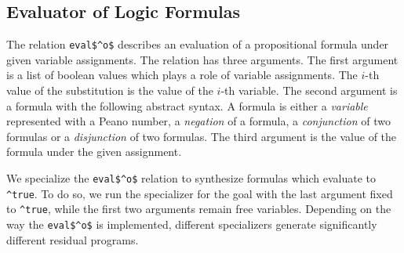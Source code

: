 



\subsection{Evaluator of Logic Formulas}

The relation \lstinline{eval$^o$} describes an evaluation of a propositional formula under given variable assignments.
The relation has three arguments. The first argument is a list of boolean values which plays a role of variable assignments.
The $i$-th value of the substitution is the value of the $i$-th variable.
The second argument is a formula with the following abstract syntax.
A formula is either a \emph{variable} represented with a Peano number, a \emph{negation} of a formula, a \emph{conjunction} of two formulas or a \emph{disjunction} of two formulas.
The third argument is the value of the formula under the given assignment.

We specialize the \lstinline{eval$^o$} relation to synthesize formulas which evaluate to \lstinline{^true}.
To do so, we run the specializer for the goal with the last argument fixed to \lstinline{^true}, while the first two arguments remain free variables.
Depending on the way the \lstinline{eval$^o$} is implemented, different specializers generate significantly different residual programs.

